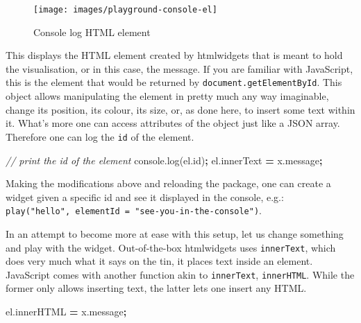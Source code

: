 \documentclass[10pt,]{krantz}
\makeatletter
\newenvironment{Shaded}{\begin{snugshade}}{\end{snugshade}}
\newcommand{\AttributeTok}[1]{\textcolor[rgb]{0.61,0.61,0.61}{#1}}
\newcommand{\CommentTok}[1]{\textcolor[rgb]{0.37,0.37,0.37}{\textit{#1}}}
\newcommand{\NormalTok}[1]{#1}
\newcommand{\OperatorTok}[1]{\textcolor[rgb]{0.43,0.43,0.43}{\textbf{#1}}}
\newcommand{\VariableTok}[1]{\textcolor[rgb]{0,0,0}{#1}}
\newenvironment{kframe}{%
\medskip{}
\setlength{\fboxsep}{.8em}
 \def\at@end@of@kframe{}%
 \ifinner\ifhmode%
  \def\at@end@of@kframe{\end{minipage}}%
  \begin{minipage}{\columnwidth}%
 \fi\fi%
 \def\FrameCommand##1{\hskip\@totalleftmargin \hskip-\fboxsep
 \colorbox{shadecolor}{##1}\hskip-\fboxsep
     \hskip-\linewidth \hskip-\@totalleftmargin \hskip\columnwidth}%
 \MakeFramed {\advance\hsize-\width
   \@totalleftmargin\z@ \linewidth\hsize
   \@setminipage}}%
 {\par\unskip\endMakeFramed%
 \at@end@of@kframe}
\renewenvironment{Shaded}{\begin{kframe}}{\end{kframe}}
\makeatother
\begin{document}
\begin{figure}[H]

{\centering \texttt{[image: images/playground-console-el]} 

}

\caption{Console log HTML element}\label{fig:playground-console-el}
\end{figure}

This displays the HTML element created by htmlwidgets that is meant to hold the visualisation, or in this case, the message. If you are familiar with JavaScript, this is the element that would be returned by \texttt{document.getElementById}. This object allows manipulating the element in pretty much any way imaginable, change its position, its colour, its size, or, as done here, to insert some text within it. What's more one can access attributes of the object just like a JSON array. Therefore one can log the \texttt{id} of the element.

\begin{Shaded}
\begin{Highlighting}[]
\CommentTok{// print the id of the element}
\VariableTok{console}\NormalTok{.}\AttributeTok{log}\NormalTok{(}\VariableTok{el}\NormalTok{.}\AttributeTok{id}\NormalTok{)}\OperatorTok{;}
\VariableTok{el}\NormalTok{.}\AttributeTok{innerText} \OperatorTok{=} \VariableTok{x}\NormalTok{.}\AttributeTok{message}\OperatorTok{;}
\end{Highlighting}
\end{Shaded}

Making the modifications above and reloading the package, one can create a widget given a specific id and see it displayed in the console, e.g.: \texttt{play("hello",\ elementId\ =\ "see-you-in-the-console")}.

In an attempt to become more at ease with this setup, let us change something and play with the widget. Out-of-the-box htmlwidgets uses \texttt{innerText}, which does very much what it says on the tin, it places text inside an element. JavaScript comes with another function akin to \texttt{innerText}, \texttt{innerHTML}. While the former only allows inserting text, the latter lets one insert any HTML.

\begin{Shaded}
\begin{Highlighting}[]
\VariableTok{el}\NormalTok{.}\AttributeTok{innerHTML} \OperatorTok{=} \VariableTok{x}\NormalTok{.}\AttributeTok{message}\OperatorTok{;}
\end{Highlighting}
\end{Shaded}
\end{document}
